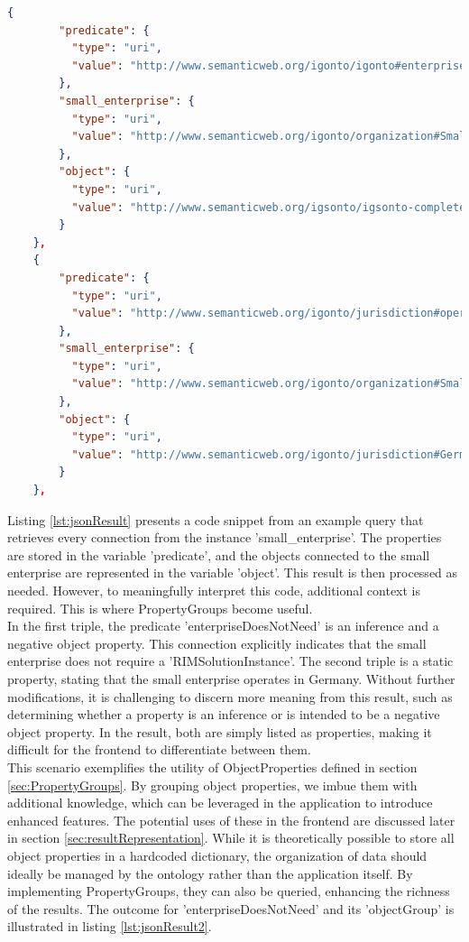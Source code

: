 \documentclass[
  a4paper,  %
  twoside,  %
  bibliography=totoc,
  headsepline,
  cleardoublepage=empty,
  parskip=half,
  draft=false
]{scrbook}
\begin{document}
\begin{lstlisting}[language=json,firstnumber=1]
    {
        "predicate": {
          "type": "uri",
          "value": "http://www.semanticweb.org/igonto/igonto#enterpriseDoesNotNeed"
        },
        "small_enterprise": {
          "type": "uri",
          "value": "http://www.semanticweb.org/igonto/organization#Small_Enterprise_Instance"
        },
        "object": {
          "type": "uri",
          "value": "http://www.semanticweb.org/igsonto/igsonto-complete#RIMSOlutionInstance"
        }
    },
    {
        "predicate": {
          "type": "uri",
          "value": "http://www.semanticweb.org/igonto/jurisdiction#operatesInCountry"
        },
        "small_enterprise": {
          "type": "uri",
          "value": "http://www.semanticweb.org/igonto/organization#Small_Enterprise_Instance"
        },
        "object": {
          "type": "uri",
          "value": "http://www.semanticweb.org/igonto/jurisdiction#Germany"
        }
    },
\end{lstlisting}\label{lst:jsonResult}

Listing \ref{lst:jsonResult} presents a code snippet from an example query that retrieves every connection from the instance 'small\_enterprise'. The properties are stored in the variable 'predicate', and the objects connected to the small enterprise are represented in the variable 'object'. This result is then processed as needed. However, to meaningfully interpret this code, additional context is required. This is where PropertyGroups become useful.\\
In the first triple, the predicate 'enterpriseDoesNotNeed' is an inference and a negative object property. This connection explicitly indicates that the small enterprise does not require a 'RIMSolutionInstance'. The second triple is a static property, stating that the small enterprise operates in Germany. Without further modifications, it is challenging to discern more meaning from this result, such as determining whether a property is an inference or is intended to be a negative object property. In the result, both are simply listed as properties, making it difficult for the frontend to differentiate between them.\\
This scenario exemplifies the utility of ObjectProperties defined in section \ref{sec:PropertyGroups}. By grouping object properties, we imbue them with additional knowledge, which can be leveraged in the application to introduce enhanced features. The potential uses of these in the frontend are discussed later in section \ref{sec:resultRepresentation}. While it is theoretically possible to store all object properties in a hardcoded dictionary, the organization of data should ideally be managed by the ontology rather than the application itself. By implementing PropertyGroups, they can also be queried, enhancing the richness of the results. The outcome for 'enterpriseDoesNotNeed' and its 'objectGroup' is illustrated in listing \ref{lst:jsonResult2}.
   
\end{document}
